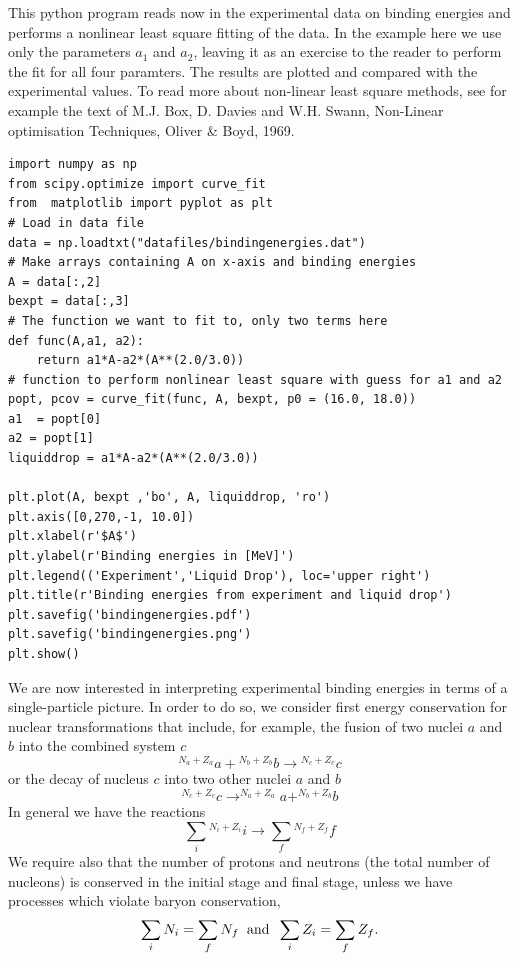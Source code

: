 \documentclass[%
twoside,                 %
final,                   %
10pt]{article}
\begin{document}
This  python program reads now in the experimental data on binding energies and performs a nonlinear least square fitting of the data. In the example here we use only the parameters $a_1$ and $a_2$, leaving it as an exercise to the reader to perform the fit for all four paramters. The results are plotted and compared with the experimental values.  To read more about non-linear least square methods, see for example the text of M.J. Box, D. Davies and W.H. Swann, Non-Linear optimisation Techniques, Oliver {\&} Boyd, 1969.
\begin{verbatim}
import numpy as np
from scipy.optimize import curve_fit
from  matplotlib import pyplot as plt
# Load in data file
data = np.loadtxt("datafiles/bindingenergies.dat")
# Make arrays containing A on x-axis and binding energies
A = data[:,2]
bexpt = data[:,3]
# The function we want to fit to, only two terms here
def func(A,a1, a2):
    return a1*A-a2*(A**(2.0/3.0))
# function to perform nonlinear least square with guess for a1 and a2
popt, pcov = curve_fit(func, A, bexpt, p0 = (16.0, 18.0))
a1  = popt[0]
a2 = popt[1]
liquiddrop = a1*A-a2*(A**(2.0/3.0))

plt.plot(A, bexpt ,'bo', A, liquiddrop, 'ro')
plt.axis([0,270,-1, 10.0])
plt.xlabel(r'$A$')
plt.ylabel(r'Binding energies in [MeV]')
plt.legend(('Experiment','Liquid Drop'), loc='upper right')
plt.title(r'Binding energies from experiment and liquid drop')
plt.savefig('bindingenergies.pdf')
plt.savefig('bindingenergies.png')
plt.show()
\end{verbatim}



We are now interested in interpreting experimental binding energies  in terms of a single-particle picture.
In order to do so, we  consider first energy conservation for nuclear transformations that include, for
example, the fusion of two nuclei $a$ and $b$ into the combined system $c$
\[
{^{N_a+Z_a}}a+ {^{N_b+Z_b}}b\rightarrow {^{N_c+Z_c}}c
\]
or the decay of nucleus $c$ into two other nuclei $a$ and $b$
\[
^{N_c+Z_c}c \rightarrow  ^{N_a+Z_a}a+ ^{N_b+Z_b}b
\]
In general we have the reactions
\[
\sum_i {^{N_i+Z_i}}i \rightarrow  \sum_f {^{N_f+Z_f}}f
\]
We require also that the number of protons and neutrons (the total number of nucleons) is conserved in the initial stage and final stage, unless we have processes which violate baryon conservation, 
\[
\sum_iN_i = \sum_f N_f \hspace{0.2cm}\mathrm{and} \hspace{0.2cm}\sum_iZ_i = \sum_f Z_f.
\]
\end{document}
